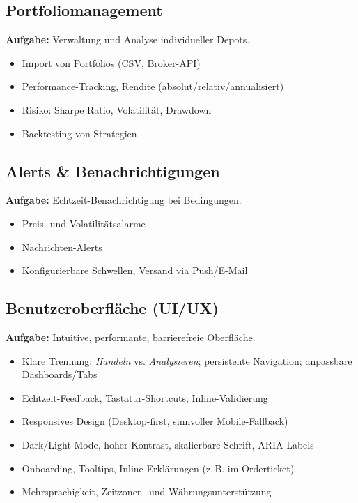 \documentclass{article}
\begin{document}
\subsection{Portfoliomanagement}
\textbf{Aufgabe:} Verwaltung und Analyse individueller Depots.
\begin{itemize}
  \item Import von Portfolios (CSV, Broker-API)
  \item Performance-Tracking, Rendite (absolut/relativ/annualisiert)
  \item Risiko: Sharpe Ratio, Volatilität, Drawdown
  \item Backtesting von Strategien
\end{itemize}

\subsection{Alerts \& Benachrichtigungen}
\textbf{Aufgabe:} Echtzeit-Benachrichtigung bei Bedingungen.
\begin{itemize}
  \item Preis- und Volatilitätsalarme
  \item Nachrichten-Alerts
  \item Konfigurierbare Schwellen, Versand via Push/E-Mail
\end{itemize}

\subsection{Benutzeroberfläche (UI/UX)}
\textbf{Aufgabe:} Intuitive, performante, barrierefreie Oberfläche.
\begin{itemize}
  \item Klare Trennung: \emph{Handeln} vs. \emph{Analysieren}; persistente Navigation; anpassbare Dashboards/Tabs
  \item Echtzeit-Feedback, Tastatur-Shortcuts, Inline-Validierung
  \item Responsives Design (Desktop-first, sinnvoller Mobile-Fallback)
  \item Dark/Light Mode, hoher Kontrast, skalierbare Schrift, ARIA-Labels
  \item Onboarding, Tooltips, Inline-Erklärungen (z.\,B. im Orderticket)
  \item Mehrsprachigkeit, Zeitzonen- und Währungsunterstützung
\end{itemize}
\end{document}
